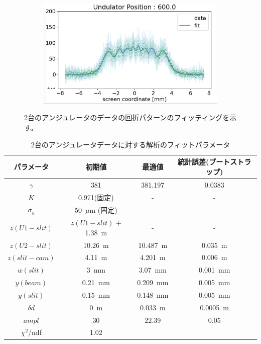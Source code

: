 \documentclass[a4paper,11pt,uplatex]{jsbook}
\begin{document}
\begin{figure}[H]
\begin{subfigure}[h]{0.45\linewidth}
  \end{subfigure}
  \hfill
  \begin{subfigure}[h]{0.45\linewidth}
    \centering
    \includegraphics[width=\linewidth]{image/4-double_600.png}
  \end{subfigure}
  \caption[2台のアンジュレータのデータ]{2台のアンジュレータのデータの回折パターンのフィッティングを示す。}\label{fig:double}
\end{figure}

\begin{table}[H]
\centering
\begin{tabular}{c|ccc}
  パラメータ & 初期値 & 最適値 &統計誤差(ブートストラップ)\\ \hline
  $\gamma$  & 381 & 381.197 & 0.0383\\
  $K$       & 0.971(固定) & - & -\\
  $\sigma_y$& 50~$\mu$m (固定) & - & -\\
  $z(U1-slit)$ & $z(U1-slit)$ + 1.38~m & - & -\\
  $z(U2-slit)$ & 10.26~m& 10.487~m & 0.035~m\\
  $z(slit-cam)$ & 4.11~m & 4.201~m & 0.006~m\\
  $w(slit)$ & 3~mm & 3.07~mm & 0.001~mm\\
  $y(beam)$ & 0.21~mm & 0.209~mm & 0.005~mm\\ 
  $y(slit)$ & 0.15~mm & 0.148~mm & 0.005~mm\\
  $\delta d$& 0~m & 0.033~m & 0.0005~m\\
  $ampl$    & 30 & 22.39 & 0.05\\ \hline
  $\chi^2$/ndf & 1.02 &  & \\ 
\end{tabular}
\caption[2台のアンジュレータのフィットパラメータ]{2台のアンジュレータデータに対する解析のフィットパラメータ}
\label{tab:double}
\end{table}
  
\end{document}
